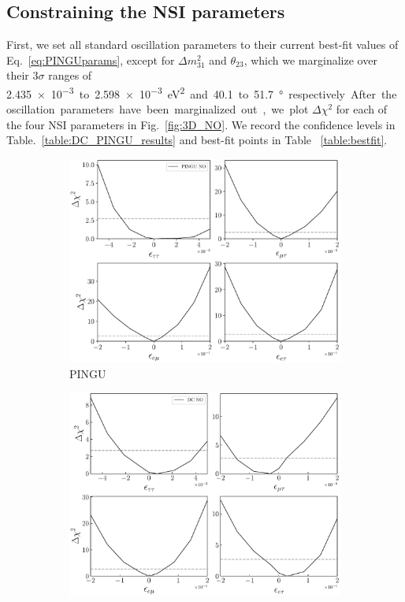 \documentclass[draft=True]{revtex4-2}
\newcommand{\dm}{\Delta m^2_{31}}
\begin{document}
\subsection{Constraining the NSI parameters}
First, we set all standard oscillation parameters to their current best-fit values of Eq.~\ref{eq:PINGUparams}, except for $\dm$ and $\theta_{23}$, 
which we marginalize over their $3\sigma$ ranges of \SI{2.435e-3} to \SI{2.598e-3}{\electronvolt^2} and \SI{40.1} to \SI{51.7}{\degree} respectively. %
After the oscillation parameters have been marginalized out, we plot $\Delta \chi^2$ for each of the four NSI parameters in Fig.~\ref{fig:3D_NO}. We record the 
confidence levels in Table.~\ref{table:DC_PINGU_results} and best-fit points in Table ~\ref{table:bestfit}.

\begin{figure}[!tb]
   \begin{center}
      \begin{subfigure}{0.4\textwidth}
         \includegraphics[width=1\linewidth]{figures/PINGU_3D_NO.pdf}
         \caption{PINGU}\label{fig:PINGU_3D_NO}
      \end{subfigure}
      \hspace{1cm}
      \begin{subfigure}{0.4\textwidth}
         \includegraphics[width=1\linewidth]{figures/DC_3D_NO.pdf}

\end{subfigure}
\end{center}
\end{figure}
\end{document}
